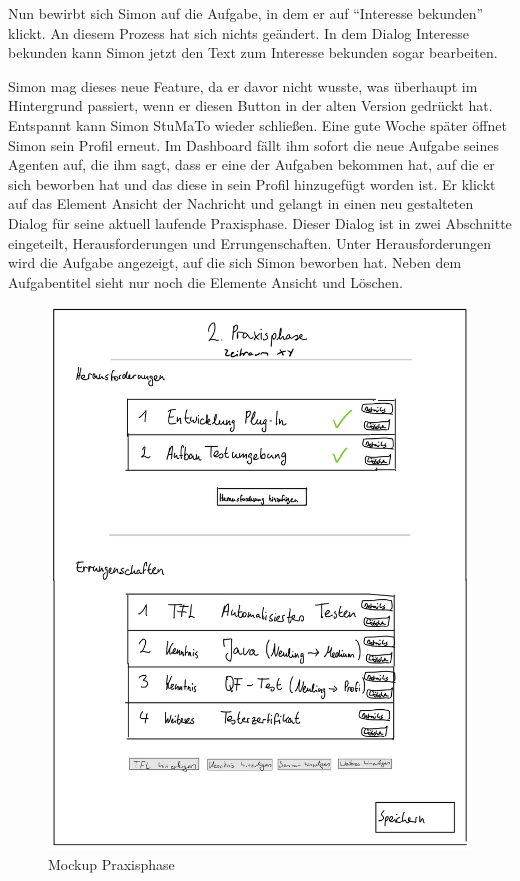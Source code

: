 \documentclass[
  12pt,
  ngerman,
  a4paper,
]{article}
\begin{document}
Nun bewirbt sich Simon auf die Aufgabe, in dem er auf ``Interesse
bekunden'' klickt. An diesem Prozess hat sich nichts geändert. In dem
Dialog Interesse bekunden kann Simon jetzt den Text zum Interesse
bekunden sogar bearbeiten.

Simon mag dieses neue Feature, da er davor nicht wusste, was überhaupt
im Hintergrund passiert, wenn er diesen Button in der alten Version
gedrückt hat. Entspannt kann Simon StuMaTo wieder schließen. Eine gute
Woche später öffnet Simon sein Profil erneut. Im Dashboard fällt ihm
sofort die neue Aufgabe seines Agenten auf, die ihm sagt, dass er eine
der Aufgaben bekommen hat, auf die er sich beworben hat und das diese in
sein Profil hinzugefügt worden ist. Er klickt auf das Element Ansicht
der Nachricht und gelangt in einen neu gestalteten Dialog für seine
aktuell laufende Praxisphase. Dieser Dialog ist in zwei Abschnitte
eingeteilt, Herausforderungen und Errungenschaften. Unter
Herausforderungen wird die Aufgabe angezeigt, auf die sich Simon
beworben hat. Neben dem Aufgabentitel sieht nur noch die Elemente
Ansicht und Löschen.

\begin{figure}
\centering
\includegraphics{./tex2pdf.-930e6666e1221838/859338669394b102ded1dca6abb3332766db3cbf.jpg}
\caption{Mockup Praxisphase}
\end{figure}
\end{document}
